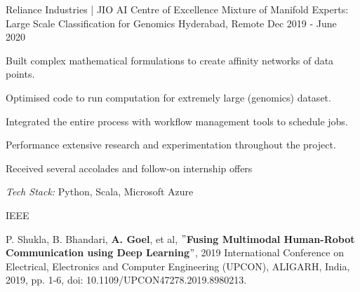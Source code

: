\documentclass[11pt, a4paper]{awesome-cv} %
\begin{document}
\begin{cventries}
  \cventry
    {Reliance Industries | JIO AI Centre of Excellence} %
    {Mixture of Manifold Experts: Large Scale Classification for Genomics} %
    {Hyderabad, Remote} %
    {Dec 2019 - June 2020} %
    {
      \begin{cvitems} %
        \item {Built complex mathematical formulations to create affinity networks of data points.}
        \item {Optimised code to run computation for extremely large (genomics) dataset.}
        \item {Integrated the entire process with workflow management tools to schedule jobs.}
        \item {Performance extensive research and experimentation throughout the project.}
        \item {Received several accolades and follow-on internship offers}
        \item {\textit{{\color{awesome-red} Tech Stack:}} Python, Scala, Microsoft Azure}
      \end{cvitems}
    }
\end{cventries}








\begin{cventries}

  \cventry
  {}
  {IEEE} {} {}
  {
    \begin{cvitems}
        \item {P. Shukla, B. Bhandari, \textbf{A. Goel}, et al, \textbf{$"$Fusing Multimodal Human-Robot Communication using Deep Learning$"$}, 2019 International Conference on Electrical, Electronics and Computer Engineering (UPCON), ALIGARH, India, 2019, pp. 1-6, doi: 10.1109/UPCON47278.2019.8980213.}
    \end{cvitems}}
\end{cventries}


\end{document}
